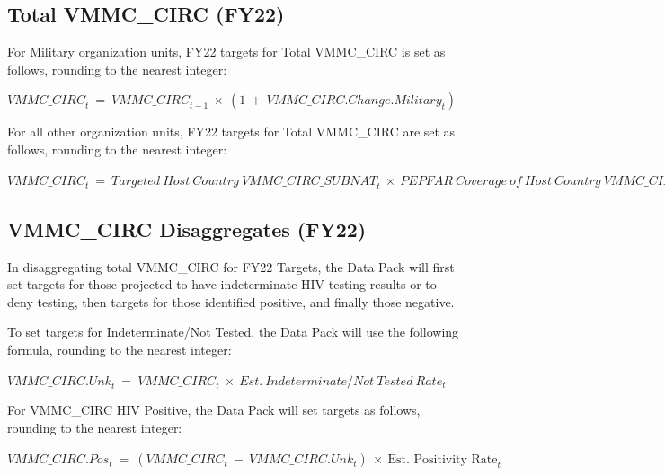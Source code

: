 \documentclass[
  openany]{book}
\begin{document}
\hypertarget{total-vmmc_circ-fy22}{%
\subsection{Total VMMC\_CIRC (FY22)}\label{total-vmmc_circ-fy22}}

For Military organization units, FY22 targets for Total VMMC\_CIRC is set
as follows, rounding to the nearest integer:

\begin{center} ${VMMC\_ CIRC}_{t}\  = \ {VMMC\_ CIRC}_{t - 1}\  \times \ (1\  + \ {VMMC\_ CIRC.Change.Military}_{t})$ \end{center}

For all other organization units, FY22 targets for Total VMMC\_CIRC are
set as follows, rounding to the nearest integer:

\begin{center} ${VMMC\_ CIRC}_{t}\  = \ {Targeted\ Host\ Country\ VMMC\_ CIRC\_ SUBNAT}_{t}\  \times \ {PEPFAR\ Coverage\ of\ Host\ Country\ VMMC\_ CIRC\_ SUBNAT}_{t}$ \end{center}

\hypertarget{vmmc_circ-disaggregates-fy22}{%
\subsection{VMMC\_CIRC Disaggregates (FY22)}\label{vmmc_circ-disaggregates-fy22}}

In disaggregating total VMMC\_CIRC for FY22 Targets, the Data Pack will
first set targets for those projected to have indeterminate HIV testing
results or to deny testing, then targets for those identified positive,
and finally those negative.

To set targets for Indeterminate/Not Tested, the Data Pack will use the
following formula, rounding to the nearest integer:

\begin{center} ${VMMC\_ CIRC.Unk}_{t}\  = \ {VMMC\_ CIRC}_{t}\  \times \ {Est.\ Indeterminate}/{Not\ Tested\ Rate}_{t}$ \end{center}

For VMMC\_CIRC HIV Positive, the Data Pack will set targets as follows,
rounding to the nearest integer:

\begin{center} ${VMMC\_ CIRC.Pos}_{t}\  = \ ({VMMC\_ CIRC}_{t}\  - \ {VMMC\_ CIRC.Unk}_{t})\  \times \ \text{Est.\ Positivity\ Rate}_{t}$ \end{center}
\end{document}

